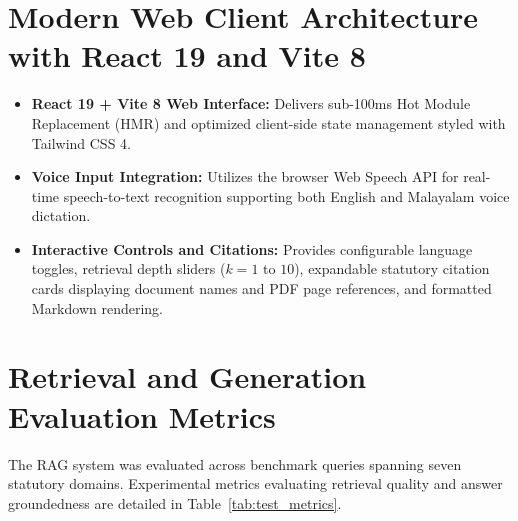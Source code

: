 \documentclass[12pt,a4paper]{report}
\begin{document}
\section{Modern Web Client Architecture with React 19 and Vite 8}
\begin{itemize}
    \item \textbf{React 19 + Vite 8 Web Interface:} Delivers sub-100ms Hot Module Replacement (HMR) and optimized client-side state management styled with Tailwind CSS 4.
    \item \textbf{Voice Input Integration:} Utilizes the browser Web Speech API for real-time speech-to-text recognition supporting both English and Malayalam voice dictation.
    \item \textbf{Interactive Controls and Citations:} Provides configurable language toggles, retrieval depth sliders ($k=1$ to $10$), expandable statutory citation cards displaying document names and PDF page references, and formatted Markdown rendering.
\end{itemize}

\section{Retrieval and Generation Evaluation Metrics}
The RAG system was evaluated across benchmark queries spanning seven statutory domains. Experimental metrics evaluating retrieval quality and answer groundedness are detailed in Table~\ref{tab:test_metrics}.
\end{document}
